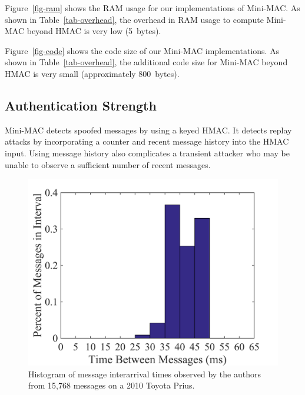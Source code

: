 Figure~\ref{fig-ram} shows the RAM usage for our implementations of Mini-MAC.
As shown in Table~\ref{tab-overhead}, the overhead in RAM usage to compute Mini-MAC
beyond HMAC is very low (5~bytes).

Figure~\ref{fig-code} shows the code size of our Mini-MAC implementations.
As shown in Table~\ref{tab-overhead}, the additional code size for Mini-MAC beyond
HMAC is very small (approximately 800~bytes).
	
\subsection{Authentication Strength}
\label{security}

Mini-MAC detects spoofed messages by using a keyed HMAC.  It detects replay attacks
by incorporating a counter and recent message history into the HMAC input.  Using message
history also complicates a transient attacker who may be unable to observe a sufficient
number of recent messages.  

	\selectfont
	\begin{figure}
		\centering
		\includegraphics[width=\columnwidth]{figures/relative_histogram.png}
		\caption{{\selectfont Histogram 
		of message interarrival times observed by the authors from 
		15,768 messages on a 2010 Toyota Prius. }}
		\label{fig-msgdelay}
	\end{figure}

